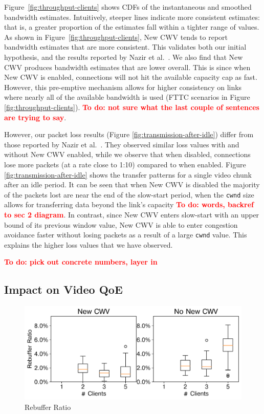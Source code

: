 \documentclass[10pt,sigconf,anonymous]{acmart}
\newcommand{\todo}[1]{\textbf{\textcolor{red}{To do: #1}}}
\begin{document}
Figure~\ref{fig:throughput-clients} shows CDFs of the instantaneous and smoothed bandwidth estimates. Intuitively, steeper lines indicate more consistent estimates: that is, a greater proportion of the estimates fall within a tighter range of values. As shown in Figure~\ref{fig:throughput-clients}, New CWV tends to report bandwidth estimates that are more consistent. This validates both our initial hypothesis, and the results reported by Nazir et al.~\cite{Nazir-2014-performance-evaluation-congestion-window-validation-dash-newcwv}. We also find that New CWV produces bandwidth estimates that are lower overall. This is since when New CWV is enabled, connections will not hit the available capacity cap as fast. However, this pre-emptive mechanism allows for higher consistency on links where nearly all of the available bandwidth is used (FTTC scenarios in Figure \ref{fig:throughput-clients}). \todo{not sure what the last couple of sentences are trying to say}.


However, our packet loss results (Figure \ref{fig:transmission-after-idle}) differ from those reported by Nazir et al.~\cite{Nazir-2014-performance-evaluation-congestion-window-validation-dash-newcwv}. They observed similar loss values with and without New CWV enabled, while we observe that when disabled, connections lose more packets (at a rate close to 1:10) compared to when enabled. Figure \ref{fig:transmission-after-idle} shows the transfer patterns for a single video chunk after an idle period. It can be seen that when New CWV is disabled the majority of the packets lost are near the end of the slow-start period, when the \texttt{cwnd} size allows for transferring data beyond the link's capacity \todo{words, backref to sec 2 diagram}. In contrast, since New CWV enters slow-start with an upper bound of its previous window value, New CWV is able to enter congestion avoidance faster without losing packets as a result of a large \texttt{cwnd} value. This explains the higher loss values that we have observed.

\todo{pick out concrete numbers, layer in}

\subsection{Impact on Video QoE}
\label{sec:QoE-impact}


\begin{figure}
      \includegraphics[width=.45\textwidth, keepaspectratio]{figures/Rebuffer_Ratio.pdf}
    \caption{Rebuffer Ratio}
    \label{fig:rebuffer-ratio}
\end{figure}
\end{document}
